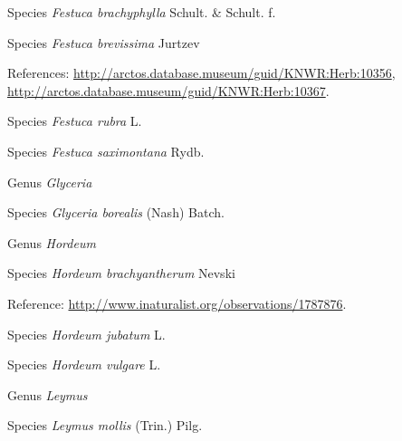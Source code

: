 \documentclass[9pt, article]{memoir}
\begin{document}
\begin{multicols}{2}
\vspace{6pt}\noindent\hspace{36pt}Species \textit{Festuca brachyphylla} Schult. \& Schult. f.


\vspace{6pt}\noindent\hspace{36pt}Species \textit{Festuca brevissima} Jurtzev


\vspace{6pt}References: 
\url{http://arctos.database.museum/guid/KNWR:Herb:10356}, 
\url{http://arctos.database.museum/guid/KNWR:Herb:10367}.

\vspace{6pt}\noindent\hspace{36pt}Species \textit{Festuca rubra} L.


\vspace{6pt}\noindent\hspace{36pt}Species \textit{Festuca saximontana} Rydb.


\vspace{6pt}\noindent\hspace{30pt}Genus \textit{Glyceria}


\vspace{6pt}\noindent\hspace{36pt}Species \textit{Glyceria borealis} (Nash) Batch.


\vspace{6pt}\noindent\hspace{30pt}Genus \textit{Hordeum}


\vspace{6pt}\noindent\hspace{36pt}Species \textit{Hordeum brachyantherum} Nevski


\vspace{6pt}Reference: 
\url{http://www.inaturalist.org/observations/1787876}.

\vspace{6pt}\noindent\hspace{36pt}Species \textit{Hordeum jubatum} L.


\vspace{6pt}\noindent\hspace{36pt}Species \textit{Hordeum vulgare} L.


\vspace{6pt}\noindent\hspace{30pt}Genus \textit{Leymus}


\vspace{6pt}\noindent\hspace{36pt}Species \textit{Leymus mollis} (Trin.) Pilg.



\end{multicols}
\end{document}
